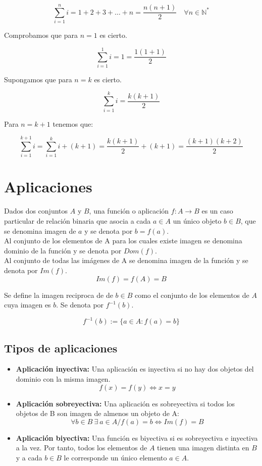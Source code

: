 $$
\sum_{i=1}^n i= 1+2+3+\dots+n= \frac{n(n+1)}{2} \quad \forall n \in \mathbb{N}^*
$$

Comprobamos que para $n=1$ es cierto.

$$
\sum_{i=1}^1 i= 1 =\frac{1(1+1)}{2}
$$

Supongamos que para $n=k$ es cierto.

$$
\sum_{i=1}^k i= \frac{k(k+1)}{2}
$$

Para $n=k+1$ tenemos que:

$$
\sum_{i=1}^{k+1} i= \sum_{i=1}^k i + (k+1) = \frac{k(k+1)}{2} + (k+1) =\frac{(k+1)(k+2)}{2}
$$

\section{Aplicaciones}
Dados dos conjuntos $A$ y $B$, una función o aplicación $f:A\rightarrow B$ es un caso particular de relación binaria que asocia a cada  $a\in A$ un único objeto $b\in B$, que se denomina imagen de $a$ y se denota por $b=f(a)$.\\

Al conjunto de los elementos de A para los cuales existe imagen se denomina dominio de la función y se denota por $Dom(f)$.\\

Al conjunto de todas las imágenes de A se denomina imagen de la función y se denota por $Im(f)$.
$$
Im(f)=f(A)=B
$$

Se define la imagen reciproca de de $b\in B$ como el conjunto de los elementos de $A$ cuya imagen es $b$. Se denota por $f^{-1}(b)$.

$$
f^{-1}(b):=\lbrace a \in A : f(a) = b \rbrace
$$

\subsection*{Tipos de aplicaciones}
\begin{itemize}
\item \textbf{Aplicación inyectiva: }Una aplicación es inyectiva si no hay dos objetos del dominio con la misma imagen.
$$
f(x)=f(y)\Longleftrightarrow x=y
$$
\item \textbf{Aplicación sobreyectiva: }Una aplicación es sobreyectiva si todos los objetos de B son imagen de almenos un objeto de A:
$$
\forall b\in B \ \exists \ a\in A / f(a)=b \Longleftrightarrow Im(f)=B
$$
\item \textbf{Aplicación biyectiva:} Una función es biyectiva si es sobreyectiva e inyectiva a la vez. Por tanto, todos los elementos de $A$ tienen una imagen distinta en $B$ y a cada $b\in B$ le corresponde un único elemento $a \in A$.
\end{itemize}


